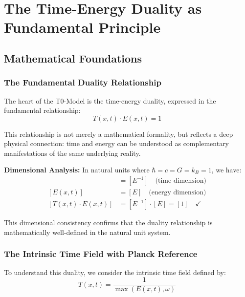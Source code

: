 \documentclass[12pt,a4paper]{report}
\newcommand{\natunits}{\hbar = c = G = k_B = 1} %
\begin{document}
	\chapter{The Time-Energy Duality as Fundamental Principle}\label{chap:time_energy_duality}
	
	\section{Mathematical Foundations}\label{sec:mathematical_foundations}
	
	\subsection{The Fundamental Duality Relationship}\label{subsec:fundamental_duality}
	
	The heart of the T0-Model is the time-energy duality, expressed in the fundamental relationship:
	\begin{equation}
		\boxed{T(x,t) \cdot E(x,t) = 1}
		\label{eq:time_energy_duality}
	\end{equation}
	
	This relationship is not merely a mathematical formality, but reflects a deep physical connection: time and energy can be understood as complementary manifestations of the same underlying reality.
	
	\textbf{Dimensional Analysis:} In natural units where $\natunits$, we have:
	\begin{align}
		[T(x,t)] &= [E^{-1}] \quad \text{(time dimension)} \\
		[E(x,t)] &= [E] \quad \text{(energy dimension)} \\
		[T(x,t) \cdot E(x,t)] &= [E^{-1}] \cdot [E] = [1] \quad \checkmark
	\end{align}
	
	This dimensional consistency confirms that the duality relationship is mathematically well-defined in the natural unit system.
	
	\subsection{The Intrinsic Time Field with Planck Reference}\label{subsec:intrinsic_time_field}
	
	To understand this duality, we consider the intrinsic time field defined by:
	\begin{equation}
		T(x,t) = \frac{1}{\max(E(x,t), \omega)}
		\label{eq:intrinsic_time_field}
	\end{equation}
	
\end{document}
